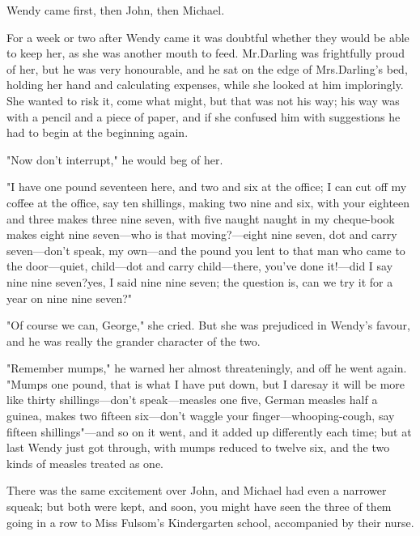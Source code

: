 Wendy came first, then John, then Michael.

For a week or two after Wendy came it was doubtful whether they would be able to keep her, as she was another mouth to feed.
Mr.\@ Darling was frightfully proud of her, but he was very honourable, and he sat on the edge of Mrs.\@ Darling's bed, holding her hand and calculating expenses, while she looked at him imploringly.
She wanted to risk it, come what might, but that was not his way;
his way was with a pencil and a piece of paper, and if she confused him with suggestions he had to begin at the beginning again.

"Now don't interrupt," he would beg of her.

"I have one pound seventeen here, and two and six at the office;
I can cut off my coffee at the office, say ten shillings, making two nine and six, with your eighteen and three makes three nine seven, with five naught naught in my cheque-book makes eight nine seven—who is that moving?—eight nine seven, dot and carry seven—don't speak, my own—and the pound you lent to that man who came to the door—quiet, child—dot and carry child—there, you've done it!—did I say nine nine seven?\@ yes, I said nine nine seven;
the question is, can we try it for a year on nine nine seven?"

"Of course we can, George," she cried.
But she was prejudiced in Wendy's favour, and he was really the grander character of the two.

"Remember mumps," he warned her almost threateningly, and off he went again.
"Mumps one pound, that is what I have put down, but I daresay it will be more like thirty shillings—don't speak—measles one five, German measles half a guinea, makes two fifteen six—don't waggle your finger—whooping-cough, say fifteen shillings"—and so on it went, and it added up differently each time;
but at last Wendy just got through, with mumps reduced to twelve six, and the two kinds of measles treated as one.

There was the same excitement over John, and Michael had even a narrower squeak;
but both were kept, and soon, you might have seen the three of them going in a row to Miss Fulsom's Kindergarten school, accompanied by their nurse.

